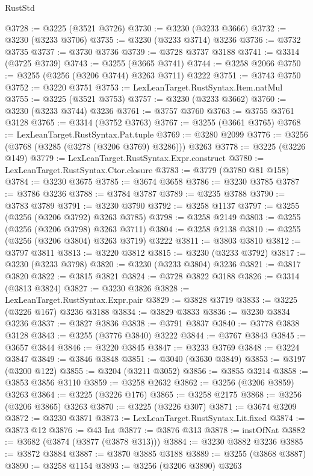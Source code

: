\begin{lexlean}{RustStd}
\begin{coremodule}
{\begin{coremodule}
{{{{{{{{{{{{{{{{{{{{{{{{{{{{{{{{{{{{{@3728 := @3225 (@3521 @3726)
@3730 := @3230 (@3233 @3666)
@3732 := @3230 (@3233 @3706)
@3735 := @3230 (@3233 @3714) @3236
@3736 := @3732 @3735
@3737 := @3730 @3736
@3739 := @3728 @3737 @3188
@3741 := @3314 (@3725 @3739)
@3743 := @3255 (@3665 @3741)
@3744 := @3258 @2066
@3750 := @3255 (@3256 (@3206 @3744) @3263 @3711) @3222
@3751 := @3743 @3750
@3752 := @3220 @3751
@3753 := LexLeanTarget.RustSyntax.Item.natMul
@3755 := @3225 (@3521 @3753)
@3757 := @3230 (@3233 @3662)
@3760 := @3230 (@3233 @3744) @3236
@3761 := @3757 @3760
@3763 := @3755 @3761 @3128
@3765 := @3314 (@3752 @3763)
@3767 := @3255 (@3661 @3765)
@3768 := LexLeanTarget.RustSyntax.Pat.tuple
@3769 := @3280 @2099
@3776 := @3256 (@3768 (@3285 (@3278 (@3206 @3769) @3286))) @3263
@3778 := @3225 (@3226 @149)
@3779 := LexLeanTarget.RustSyntax.Expr.construct
@3780 := LexLeanTarget.RustSyntax.Ctor.closure
@3783 := @3779 (@3780 @81 @158)
@3784 := @3230 @3675
@3785 := @3674 @3658
@3786 := @3230 @3785
@3787 := @3786 @3236
@3788 := @3784 @3787
@3789 := @3235 @3788
@3790 := @3783 @3789
@3791 := @3230 @3790
@3792 := @3258 @1137
@3797 := @3255 (@3256 (@3206 @3792) @3263 @3785)
@3798 := @3258 @2149
@3803 := @3255 (@3256 (@3206 @3798) @3263 @3711)
@3804 := @3258 @2138
@3810 := @3255 (@3256 (@3206 @3804) @3263 @3719) @3222
@3811 := @3803 @3810
@3812 := @3797 @3811
@3813 := @3220 @3812
@3815 := @3230 (@3233 @3792)
@3817 := @3230 (@3233 @3798)
@3820 := @3230 (@3233 @3804) @3236
@3821 := @3817 @3820
@3822 := @3815 @3821
@3824 := @3728 @3822 @3188
@3826 := @3314 (@3813 @3824)
@3827 := @3230 @3826
@3828 := LexLeanTarget.RustSyntax.Expr.pair
@3829 := @3828 @3719
@3833 := @3225 (@3226 @167) @3236 @3188
@3834 := @3829 @3833
@3836 := @3230 @3834 @3236
@3837 := @3827 @3836
@3838 := @3791 @3837
@3840 := @3778 @3838 @3128
@3843 := @3255 (@3776 @3840) @3222
@3844 := @3767 @3843
@3845 := @3657 @3844
@3846 := @3220 @3845
@3847 := @3233 @3769
@3848 := @3224 @3847
@3849 := @3846 @3848
@3851 := @3040 (@3630 @3849)
@3853 := @3197 (@3200 @122)
@3855 := @3204 (@3211 @3052)
@3856 := @3855 @3214
@3858 := @3853 @3856 @3110
@3859 := @3258 @2632
@3862 := @3256 (@3206 @3859) @3263
@3864 := @3225 (@3226 @176)
@3865 := @3258 @2175
@3868 := @3256 (@3206 @3865) @3263
@3870 := @3225 (@3226 @307)
@3871 := @3674 @3209
@3872 := @3230 @3871
@3873 := LexLeanTarget.RustSyntax.Lit.fixed
@3874 := @3873 @12
@3876 := @43 Int
@3877 := @3876 @313
@3878 := instOfNat
@3882 := @3682 (@3874 (@3877 (@3878 @313)))
@3884 := @3230 @3882 @3236
@3885 := @3872 @3884
@3887 := @3870 @3885 @3188
@3889 := @3255 (@3868 @3887)
@3890 := @3258 @1154
@3893 := @3256 (@3206 @3890) @3263
}}}}}}}}}}}}}}}}}}}}}}}}}}}}}}}}}}}}}
\end{coremodule}}
\end{coremodule}
\end{lexlean}
